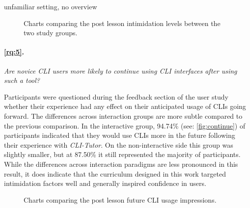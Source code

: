\begin{quotes}
unfamiliar setting, no overview
\end{quotes}


\begin{figure}[htbp]
	\centering
	\scalebox{0.67}{}
	\caption{Charts comparing the post lesson intimidation levels between the two study groups.}
	\label{fig:confidence}
\end{figure}
\clearpage

\paragraph{\ref{rq:5}.} \textit{Are novice CLI users more likely to continue using CLI interfaces
after using such a tool?}

Participants were questioned during the feedback section of the user study
whether their experience had any effect on their anticipated usage of CLIs
going forward. The differences across interaction groups are more subtle
compared to the previous comparison. In the interactive group, 94.74\% (see:
\autoref{fig:continue}) of participants indicated that they would use CLIs more
in the future following their experience with \textit{CLI-Tutor}. On the
non-interactive side this group was slightly smaller, but at 87.50\% it still
represented the majority of participants. While the differences across
interaction paradigms are less pronounced in this result, it does indicate that
the curriculum designed in this work targeted intimidation factors well and
generally inspired confidence in users. 

\begin{figure}[htbp]
	\centering
	\scalebox{0.67}{}
	\caption{Charts comparing the post lesson future CLI usage impressions.}
	\label{fig:continue}
\end{figure}
